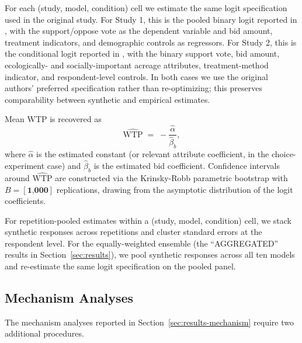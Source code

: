 \documentclass[12pt]{article}
\begin{document}
For each (study, model, condition) cell we estimate the same logit specification used in the original study. For Study 1, this is the pooled binary logit reported in \textcite{Aldy2012}, with the support/oppose vote as the dependent variable and bid amount, treatment indicators, and demographic controls as regressors. For Study 2, this is the conditional logit reported in \textcite{Giguere2020}, with the binary support vote, bid amount, ecologically- and socially-important acreage attributes, treatment-method indicator, and respondent-level controls. In both cases we use the original authors' preferred specification rather than re-optimizing; this preserves comparability between synthetic and empirical estimates.

Mean WTP is recovered as
\begin{equation}
    \widehat{\text{WTP}} \;=\; -\frac{\hat{\alpha}}{\hat{\beta}_b},
    \label{eq:wtp}
\end{equation}
where $\hat{\alpha}$ is the estimated constant (or relevant attribute coefficient, in the choice-experiment case) and $\hat{\beta}_b$ is the estimated bid coefficient. Confidence intervals around $\widehat{\text{WTP}}$ are constructed via the Krinsky-Robb parametric bootstrap with $B = [\textbf{1{,}000}]$ replications, drawing from the asymptotic distribution of the logit coefficients.

For repetition-pooled estimates within a (study, model, condition) cell, we stack synthetic responses across repetitions and cluster standard errors at the respondent level. For the equally-weighted ensemble (the ``AGGREGATED'' results in Section~\ref{sec:results}), we pool synthetic responses across all ten models and re-estimate the same logit specification on the pooled panel.

\subsection{Mechanism Analyses}\label{sec:methods-mechanism}

The mechanism analyses reported in Section~\ref{sec:results-mechanism} require two additional procedures.
\end{document}

